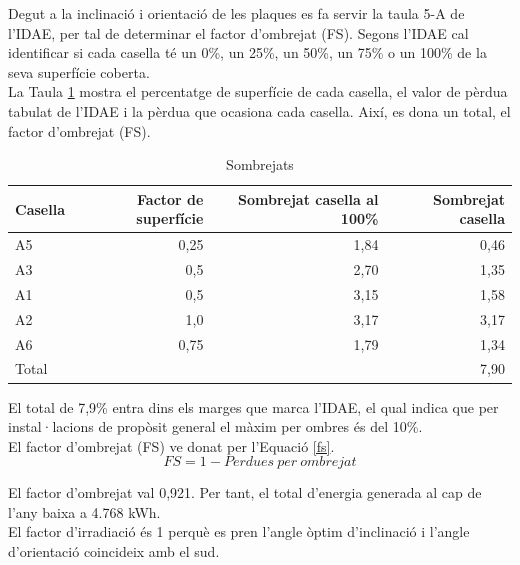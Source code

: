 \noindent Degut a la inclinació i orientació de les plaques es fa servir la taula 5-A de l'IDAE, per tal de determinar el factor d'ombrejat (FS). Segons l'IDAE cal identificar si cada casella té un 0\%, un 25\%, un 50\%, un 75\% o un 100\% de la seva superfície coberta.\\
\newline La Taula \ref{tab:ombres} mostra el percentatge de superfície de cada casella, el valor de pèrdua tabulat de l'IDAE i la pèrdua que ocasiona cada casella. Així, es dona un total, el factor d'ombrejat (FS).
\begin{table}[H]
\small
  \centering
    \begin{tabular} {|l|r|r|r|}
 \hline  
 \multicolumn{1}{|l|}{Casella} &  \multicolumn{1}{r|}{Factor de superfície} &  \multicolumn{1}{r|}{Sombrejat casella al 100\%} &  \multicolumn{1}{r|}{Sombrejat casella} \\ \hline \hline
A5 & 0,25 & 1,84 & 0,46 \\ \hline
A3 & 0,5 & 2,70 & 1,35 \\ \hline
A1 & 0,5 & 3,15 & 1,58 \\ \hline
A2 & 1,0 & 3,17 & 3,17 \\ \hline
A6 & 0,75 & 1,79 & 1,34 \\ \hline \hline
Total & \multicolumn{3}{r|}{7,90} \\ \hline

    \end{tabular}%
    \caption{Sombrejats}
    \label{tab:ombres}
\end{table}%

\noindent El total de 7,9\% entra dins els marges que marca l'IDAE, el qual indica que per instal·lacions de propòsit general el màxim per ombres és del 10\%.\\
\newline El factor d'ombrejat (FS) ve donat per l'Equació \ref{fs}.
\begin{equation} \label{fs}
FS = 1-Perdues \ per \ ombrejat
\end{equation}

\noindent El factor d'ombrejat val 0,921. Per tant, el total d'energia generada al cap de l'any baixa a 4.768 kWh.\\
\newline El factor d'irradiació és 1 perquè es pren l'angle òptim d'inclinació i l'angle d'orientació coincideix amb el sud.


